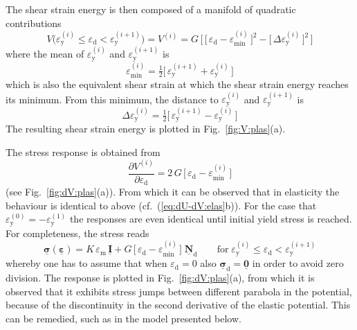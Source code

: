 \documentclass[times,namecite]{goose-article}
\newcommand\T[1]{\underline{\bm{{#1}}}}
\begin{document}
The shear strain energy is then composed of a manifold of quadratic contributions
\begin{equation}\label{eq:V-plas}
  V \big(
    \varepsilon_\mathrm{y}^{(i)} \leq \varepsilon_\mathrm{d} < \varepsilon_\mathrm{y}^{(i+1)}
  \big)
  =
  V^{(i)}
  =
  G \, \bigg[\,
    \Big[\, \varepsilon_\mathrm{d} - \varepsilon_\mathrm{min}^{(i)} \,\Big]^2
    -
    \Big[\, \Delta \varepsilon_\mathrm{y}^{(i)} \,\Big]^2
  \,\bigg]
\end{equation}
where the mean of $\varepsilon_\mathrm{y}^{(i)}$ and $\varepsilon_\mathrm{y}^{(i+1)}$ is
\begin{equation}
  \varepsilon_\mathrm{min}^{(i)}
  =
  \tfrac{1}{2} \Big[\, \varepsilon_\mathrm{y}^{(i+1)} + \varepsilon_\mathrm{y}^{(i)} \,\Big]
\end{equation}
which is also the equivalent shear strain at which the shear strain energy reaches its minimum. From this minimum, the distance to $\varepsilon_\mathrm{y}^{(i)}$ and $\varepsilon_\mathrm{y}^{(i+1)}$ is
\begin{equation}
  \Delta \varepsilon_\mathrm{y}^{(i)}
  =
  \tfrac{1}{2} \Big[\, \varepsilon_\mathrm{y}^{(i+1)} - \varepsilon_\mathrm{y}^{(i)} \,\Big]
\end{equation}
The resulting shear strain energy is plotted in Fig.~\ref{fig:V:plas}(a).

The stress response is obtained from
\begin{equation}\label{eq:dV-plas}
  \frac{\partial V^{(i)}}{\partial \varepsilon_\mathrm{d}}
  =
  2 \, G \, \Big[\, \varepsilon_\mathrm{d} - \varepsilon_\mathrm{min}^{(i)} \,\Big]
\end{equation}
(see Fig.~\ref{fig:dV:plas}(a)). From which it can be observed that in elasticity the behaviour is identical to above (cf.~(\ref{eq:dU-dV:elas}b)). For the case that $\varepsilon_\mathrm{y}^{(0)} = - \varepsilon_\mathrm{y}^{(1)}$ the responses are even identical until initial yield stress is reached. For completeness, the stress reads
\begin{equation}
  \T{\sigma} ( \T{\varepsilon} )
  =
  K \, \varepsilon_\mathrm{m} \, \T{I}
  +
  G \, \Big[\, \varepsilon_\mathrm{d} - \varepsilon_\mathrm{min}^{(i)} \,\Big] \;
  \T{N}_\mathrm{d}
  \qquad
  \mathrm{for}
  \;
  \varepsilon_\mathrm{y}^{(i)} \leq \varepsilon_\mathrm{d} < \varepsilon_\mathrm{y}^{(i+1)}
\end{equation}
whereby one has to assume that when $\varepsilon_\mathrm{d} = 0$ also $\T{\sigma}_\mathrm{d} = \T{0}$ in order to avoid zero division. The response is plotted in Fig.~\ref{fig:dV:plas}(a), from which it is observed that it exhibits stress jumps between different parabola in the potential, because of the discontinuity in the second derivative of the elastic potential. This can be remedied, such as in the model presented below.
\end{document}

